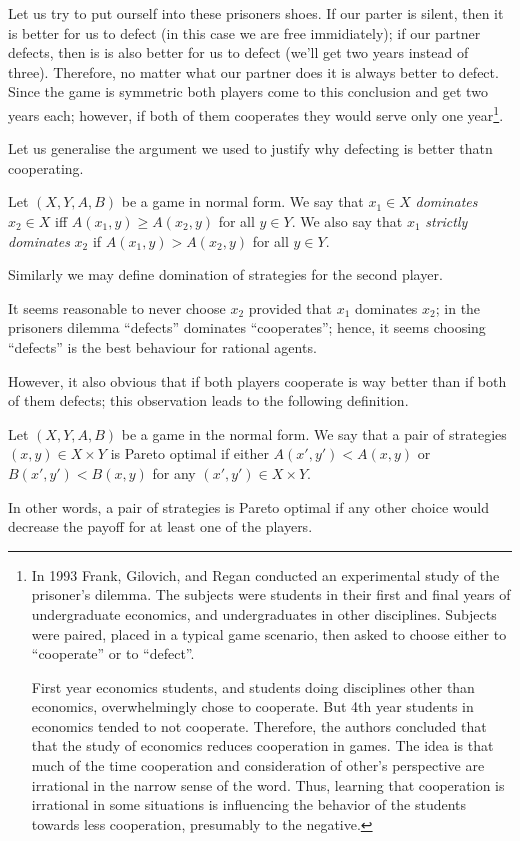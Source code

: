 Let us try to put ourself into these prisoners shoes. If our parter is silent,
then it is better for us to defect (in this case we are free immidiately); if
our partner defects, then is is also better for us to defect (we'll get two
years instead of three). Therefore, no matter what our partner does it is always
better to defect. Since the game is symmetric both players come to this
conclusion and get two years each; however, if both of them cooperates they
would serve only one year\footnote{%
  In 1993 Frank, Gilovich, and Regan conducted an experimental study of the
  prisoner's dilemma. The subjects were students in their first and final years
  of undergraduate economics, and undergraduates in other disciplines. Subjects
  were paired, placed in a typical game scenario, then asked to choose either to
  ``cooperate'' or to ``defect''. 

  First year economics students, and students doing disciplines other than
  economics, overwhelmingly chose to cooperate. But 4th year students in
  economics tended to not cooperate. Therefore, the authors concluded that
  that the study of economics reduces cooperation in games. The idea is
  that much of the time cooperation and consideration of other's perspective are
  irrational in the narrow sense of the word. Thus, learning that cooperation is
  irrational in some situations is influencing the behavior of the students
  towards less cooperation, presumably to the negative.
}.

Let us generalise the argument we used to justify why defecting is better thatn
cooperating.
\begin{definition}
  Let $(X, Y, A, B)$ be a game in normal form. We say that $x_1 \in X$
  \emph{dominates} $x_2 \in X$ iff $A(x_1, y) \ge A(x_2, y)$ for all $y \in Y$.
  We also say that $x_1$ \emph{strictly dominates} $x_2$ if $A(x_1, y) > A(x_2,
  y)$ for all $y \in Y$.

  Similarly we may define domination of strategies for the second player.
\end{definition}
It seems reasonable to never choose $x_2$ provided that $x_1$ dominates $x_2$; in
the prisoners dilemma ``defects'' dominates ``cooperates''; hence, it seems
choosing ``defects'' is the best behaviour for rational agents.

However, it also obvious that if both players cooperate is way better than if
both of them defects; this observation leads to the following definition.
\begin{definition}
  Let $(X, Y, A, B)$  be a game in the normal form. We say that a pair of
  strategies $(x, y) \in X \times Y$ is Pareto optimal if either 
  $A(x', y') < A(x, y)$ or $B(x', y') < B(x, y)$ for any 
  $(x', y') \in X \times Y$.
\end{definition}
In other words, a pair of strategies is Pareto optimal if any other choice would
decrease the payoff for at least one of the players.

